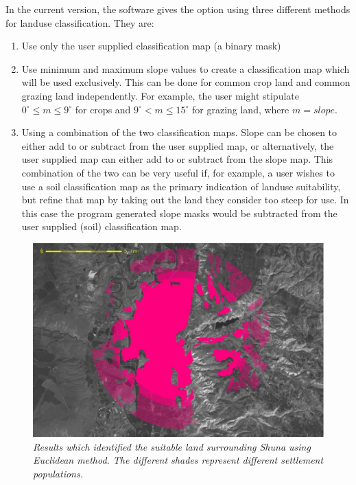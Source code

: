   In the current version, the software gives the option using three different
  methods for landuse classification.  They are: 
  \begin{enumerate} 
    \item  Use only the user supplied classification map (a binary mask) 
    \item  Use minimum and maximum slope values to create a classification map
      which will be used exclusively.  This can be done for common crop land and
      common grazing land independently.  For example, the user might stipulate
      $0^\circ \leq m \leq 9^\circ$ for crops and $9^\circ < m \leq 15^\circ$
      for grazing land, where $m=slope$.  
    \item  Using a combination of the two classification maps.  Slope can be
      chosen to either add to or subtract from the user supplied map, or 
      alternatively, the user supplied map can either add to or subtract from
      the slope map.  This combination of the two can be very useful if, for 
      example, a user wishes to use a soil classification map as the primary
      indication of landuse suitability, but refine that map by taking out the
      land they consider too steep for use. In this case the program generated
      slope masks would be subtracted from the user supplied (soil) classification map.  
  \end{enumerate}
  
\begin{figure}[htbp] %
  \includegraphics[scale=0.225]{./images/landcatchment.jpg}
  \caption{\label{fig:landCatchment}\textit{Results which identified the suitable land
    surrounding Shuna using Euclidean method. The different shades represent
    different settlement populations.}}
\end{figure}

